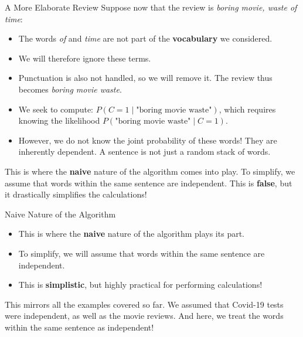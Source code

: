 \begin{frame}{A More Elaborate Review}
	Suppose now that the review is \textit{boring movie, waste of time}:
	\begin{itemize}
		\item The words \textit{of} and \textit{time} are not part of the \textbf{vocabulary} we considered.
		\pause
		\item We will therefore ignore these terms.
		\pause
		\item Punctuation is also not handled, so we will remove it. The review thus becomes \textit{boring movie waste}.
		\pause
		\item We seek to compute: $P(C = 1 \mid \text{"boring movie waste"})$, which requires knowing the likelihood $P(\text{"boring movie waste"} \mid C = 1)$.
		\pause
		\item However, we do not know the joint probability of these words! They are inherently dependent. A sentence is not just a random stack of words.
	\end{itemize}
	\pause
	This is where the \textbf{naive} nature of the algorithm comes into play. To simplify, we assume that words within the same sentence are independent. This is \textbf{false}, but it drastically simplifies the calculations!
\end{frame}

\begin{frame}{Naive Nature of the Algorithm}
	\begin{itemize}
		\item This is where the \textbf{naive} nature of the algorithm plays its part.
		\pause
		\item To simplify, we will assume that words within the same sentence are independent.
		\pause
		\item This is \textbf{simplistic}, but highly practical for performing calculations!
	\end{itemize}
	\pause
	\vspace{0.5cm}
	This mirrors all the examples covered so far. We assumed that Covid-19 tests were independent, as well as the movie reviews. And here, we treat the words within the same sentence as independent!
\end{frame}

